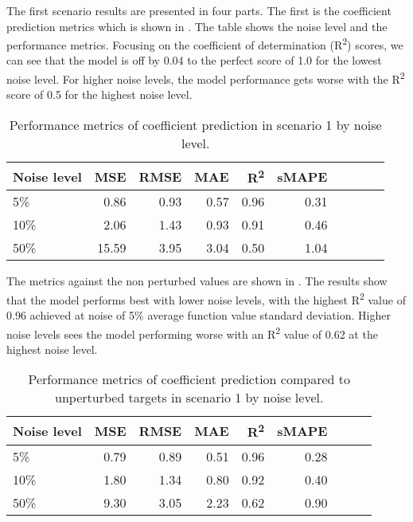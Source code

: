 The first scenario results are presented in four parts. The first is the coefficient prediction metrics which is shown in . The table shows the noise level and the performance metrics. Focusing on the coefficient of determination (R\textsuperscript{2}) scores, we can see that the model is off by 0.04 to the perfect score of 1.0 for the lowest noise level. For higher noise levels, the model performance gets worse with the R\textsuperscript{2} score of 0.5 for the highest noise level.
\begin{table}[H]
  \caption{Performance metrics of coefficient prediction in scenario 1 by noise level.}\label{table:scenario_1_spectral_metrics}
  \centering
  \begin{tabular}{lrrrrrrrrr}
    \toprule
    Noise level & MSE   & RMSE & MAE  & R\textsuperscript{2} & sMAPE \\
    \midrule
    5\%         & 0.86  & 0.93 & 0.57 & 0.96                 & 0.31  \\
    10\%        & 2.06  & 1.43 & 0.93 & 0.91                 & 0.46  \\
    50\%        & 15.59 & 3.95 & 3.04 & 0.50                 & 1.04  \\
    \bottomrule
  \end{tabular}
\end{table}

The metrics against the non perturbed values are shown in . The results show that the model performs best with lower noise levels, with the highest R\textsuperscript{2} value of 0.96 achieved at noise of 5\% average function value standard deviation. Higher noise levels sees the model performing worse with an R\textsuperscript{2} value of 0.62 at the highest noise level.

\begin{table}[H]
  \caption{Performance metrics of coefficient prediction compared to unperturbed targets in scenario 1 by noise level.}\label{table:scenario_1_clean_spectral_metrics}
  \centering
  \begin{tabular}{lrrrrrrrr}
    \toprule
    Noise level & MSE  & RMSE & MAE  & R\textsuperscript{2} & sMAPE \\
    \midrule
    5\%         & 0.79 & 0.89 & 0.51 & 0.96                 & 0.28  \\
    10\%        & 1.80 & 1.34 & 0.80 & 0.92                 & 0.40  \\
    50\%        & 9.30 & 3.05 & 2.23 & 0.62                 & 0.90  \\
    \bottomrule
  \end{tabular}
\end{table}

